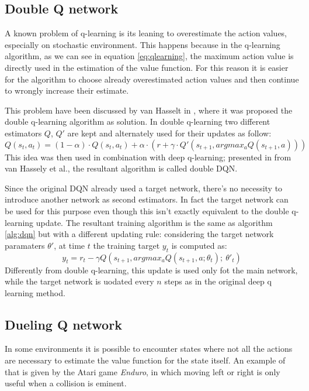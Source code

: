 \documentclass[article,11pt]{article}
\begin{document}
	\subsection{Double Q network}
	A known problem of q-learning is its leaning to overestimate the action values, especially on stochastic environment. This happens because in the q-learning algorithm, as we can see in equation \ref{eq:qlearning}, the maximum action value is directly used in the estimation of the value function. For this reason it is easier for the algorithm to choose already overestimated action values and then continue to wrongly increase their estimate.
	
	This problem have been discussed by van Hasselt in \cite{doubleq}, where it was proposed the double q-learning algorithm as solution. In double q-learning two different estimators $Q$, $Q'$ are kept and alternately used for their updates as follow:
	\begin{equation}
		\label{eq:doubleq}
		Q(s_t, a_t)=(1-\alpha)\cdot Q(s_t, a_t) + \alpha \cdot (r + \gamma\cdot Q'(s_{t+1}, argmax_aQ(s_{t+1}, a)))
	\end{equation}
	This idea was then used in combination with deep q-learning; presented in \cite{doubledqn} from van Hassely et al., the resultant algorithm is called double DQN.
	
	Since the original DQN already used a target network, there's no necessity to introduce another network as second estimators. In fact the target network can be used for this purpose even though this isn't exactly equivalent to the double q-learning update. The resultant training algorithm is the same as algorithm \ref{alg:dqn} but with a different updating rule: considering the target network paramaters $\theta'$, at time $t$ the training target $y_t$ is computed as:
	\begin{equation}
		y_t = r_t - \gamma Q(s_{t+1}, argmax_aQ(s_{t+1}, a; \theta_t);\ \theta'_t)
	\end{equation}
	Differently from double q-learning, this update is used only fot the main network, while the target network is uodated every $n$ steps as in the original deep q learning method.
	
	\subsection{Dueling Q network}
	In some environments it is possible to encounter states where not all the actions are necessary to estimate the value function for the state itself. An example of that is given by the Atari game \textit{Enduro}, in which moving left or right is only useful when a collision is eminent.
	
\end{document}
